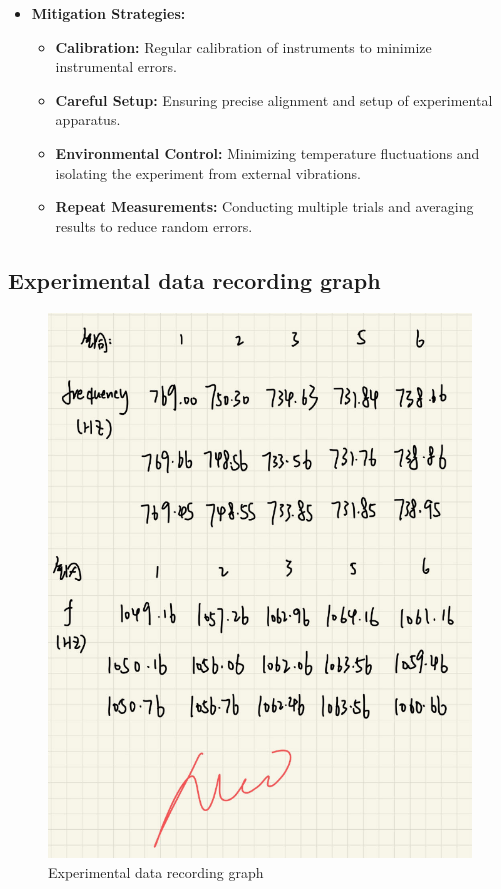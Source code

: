 \documentclass[UTF8]{article}
\begin{document}
\begin{itemize}
    \item \textbf{Mitigation Strategies:}
    \begin{itemize}
        \item \textbf{Calibration:} Regular calibration of instruments to minimize instrumental errors.
        \item \textbf{Careful Setup:} Ensuring precise alignment and setup of experimental apparatus.
        \item \textbf{Environmental Control:} Minimizing temperature fluctuations and isolating the experiment from external vibrations.
        \item \textbf{Repeat Measurements:} Conducting multiple trials and averaging results to reduce random errors.
    \end{itemize}

\end{itemize}


\begin{appendix}
 \section{Experimental data recording graph} 
     	\begin{figure}[H]
     	    	\centering
     	    	\includegraphics[clip,scale=0.8,trim={0 0 0 0}]{fig/fig14.png}
     	        \caption{Experimental data recording graph}
     	        \label{figure.19}
         \end{figure} 
 \end{appendix}        
\end{document}
